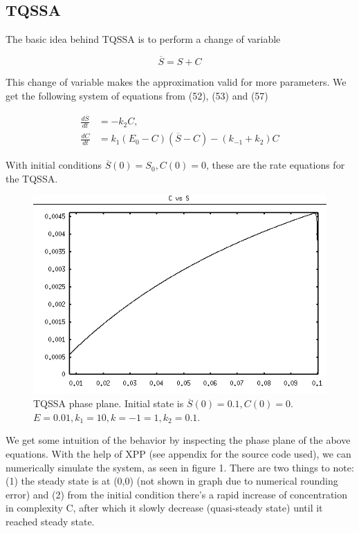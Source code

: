 \documentclass[12pt]{article}
\begin{document}
\subsection{TQSSA}

The basic idea behind TQSSA is to perform a change of variable

\begin{equation}
\overline{S} = S + C
\end{equation}

This change of variable makes the approximation valid for more parameters. We
get the following system of equations from (52), (53) and (57)

\begin{align}
\frac{d\overline{S}}{dt} &= - k_2 C, \\
\frac{dC}{dt} &= k_1(E_0-C)(\overline{S}-C)-(k_{-1}+ k_2) C
\end{align}

With initial conditions $\overline{S}(0)=S_0, C(0)=0$, these are the rate
equations for the TQSSA.

\begin{figure}[ht!]
\centering
\includegraphics[width=120mm]
{tqssa-phase-plane-b.png}
\caption{TQSSA phase plane. Initial state is $\overline{S}(0)=0.1,
  C(0)=0$. $E=0.01, k_1=10, k={-1}=1, k_2=0.1$.}
\label{overflow}
\end{figure}

We get some intuition of the behavior by inspecting the phase plane of
the above equations. With the help of XPP (see appendix for the source
code used), we can numerically simulate the system, as seen in figure
1. There are two things to note: (1) the steady state is at (0,0) (not
shown in graph due to numerical rounding error) and (2) from the initial
condition there's a rapid increase of concentration in complexity C,
after which it slowly decrease (quasi-steady state) until it reached
steady state.
\end{document}
